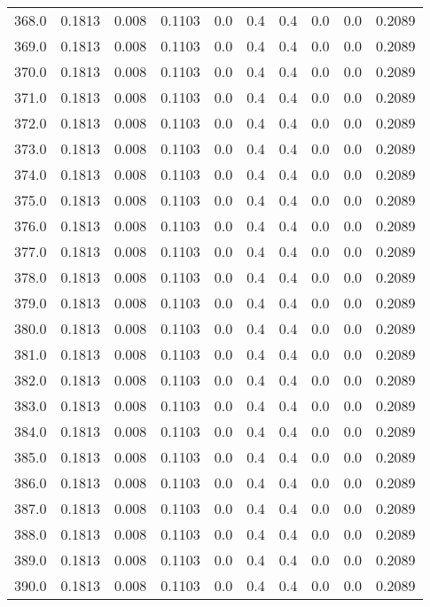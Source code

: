 \begin{longtable}{lrrrrrrrrr}
368.0 & 0.1813 & 0.008 & 0.1103 & 0.0 & 0.4 & 0.4 & 0.0 & 0.0 & 0.2089 \\
369.0 & 0.1813 & 0.008 & 0.1103 & 0.0 & 0.4 & 0.4 & 0.0 & 0.0 & 0.2089 \\
370.0 & 0.1813 & 0.008 & 0.1103 & 0.0 & 0.4 & 0.4 & 0.0 & 0.0 & 0.2089 \\
371.0 & 0.1813 & 0.008 & 0.1103 & 0.0 & 0.4 & 0.4 & 0.0 & 0.0 & 0.2089 \\
372.0 & 0.1813 & 0.008 & 0.1103 & 0.0 & 0.4 & 0.4 & 0.0 & 0.0 & 0.2089 \\
373.0 & 0.1813 & 0.008 & 0.1103 & 0.0 & 0.4 & 0.4 & 0.0 & 0.0 & 0.2089 \\
374.0 & 0.1813 & 0.008 & 0.1103 & 0.0 & 0.4 & 0.4 & 0.0 & 0.0 & 0.2089 \\
375.0 & 0.1813 & 0.008 & 0.1103 & 0.0 & 0.4 & 0.4 & 0.0 & 0.0 & 0.2089 \\
376.0 & 0.1813 & 0.008 & 0.1103 & 0.0 & 0.4 & 0.4 & 0.0 & 0.0 & 0.2089 \\
377.0 & 0.1813 & 0.008 & 0.1103 & 0.0 & 0.4 & 0.4 & 0.0 & 0.0 & 0.2089 \\
378.0 & 0.1813 & 0.008 & 0.1103 & 0.0 & 0.4 & 0.4 & 0.0 & 0.0 & 0.2089 \\
379.0 & 0.1813 & 0.008 & 0.1103 & 0.0 & 0.4 & 0.4 & 0.0 & 0.0 & 0.2089 \\
380.0 & 0.1813 & 0.008 & 0.1103 & 0.0 & 0.4 & 0.4 & 0.0 & 0.0 & 0.2089 \\
381.0 & 0.1813 & 0.008 & 0.1103 & 0.0 & 0.4 & 0.4 & 0.0 & 0.0 & 0.2089 \\
382.0 & 0.1813 & 0.008 & 0.1103 & 0.0 & 0.4 & 0.4 & 0.0 & 0.0 & 0.2089 \\
383.0 & 0.1813 & 0.008 & 0.1103 & 0.0 & 0.4 & 0.4 & 0.0 & 0.0 & 0.2089 \\
384.0 & 0.1813 & 0.008 & 0.1103 & 0.0 & 0.4 & 0.4 & 0.0 & 0.0 & 0.2089 \\
385.0 & 0.1813 & 0.008 & 0.1103 & 0.0 & 0.4 & 0.4 & 0.0 & 0.0 & 0.2089 \\
386.0 & 0.1813 & 0.008 & 0.1103 & 0.0 & 0.4 & 0.4 & 0.0 & 0.0 & 0.2089 \\
387.0 & 0.1813 & 0.008 & 0.1103 & 0.0 & 0.4 & 0.4 & 0.0 & 0.0 & 0.2089 \\
388.0 & 0.1813 & 0.008 & 0.1103 & 0.0 & 0.4 & 0.4 & 0.0 & 0.0 & 0.2089 \\
389.0 & 0.1813 & 0.008 & 0.1103 & 0.0 & 0.4 & 0.4 & 0.0 & 0.0 & 0.2089 \\
390.0 & 0.1813 & 0.008 & 0.1103 & 0.0 & 0.4 & 0.4 & 0.0 & 0.0 & 0.2089 \\

\end{longtable}

